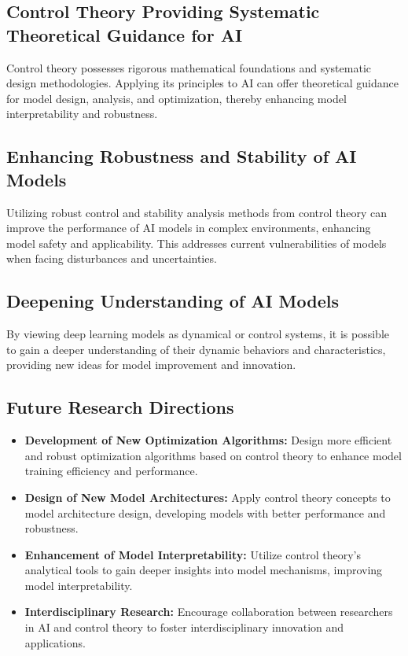 \documentclass{article}
\theoremstyle{plain}
\theoremstyle{definition}
\theoremstyle{remark}
\begin{document}
\subsection{Control Theory Providing Systematic Theoretical Guidance for AI}
Control theory possesses rigorous mathematical foundations and systematic design methodologies. Applying its principles to AI can offer theoretical guidance for model design, analysis, and optimization, thereby enhancing model interpretability and robustness.

\subsection{Enhancing Robustness and Stability of AI Models}
Utilizing robust control and stability analysis methods from control theory can improve the performance of AI models in complex environments, enhancing model safety and applicability. This addresses current vulnerabilities of models when facing disturbances and uncertainties.

\subsection{Deepening Understanding of AI Models}
By viewing deep learning models as dynamical or control systems, it is possible to gain a deeper understanding of their dynamic behaviors and characteristics, providing new ideas for model improvement and innovation.

\subsection{Future Research Directions}
\begin{itemize}
    \item \textbf{Development of New Optimization Algorithms:} Design more efficient and robust optimization algorithms based on control theory to enhance model training efficiency and performance.
    
    \item \textbf{Design of New Model Architectures:} Apply control theory concepts to model architecture design, developing models with better performance and robustness.
    
    \item \textbf{Enhancement of Model Interpretability:} Utilize control theory's analytical tools to gain deeper insights into model mechanisms, improving model interpretability.
    
    \item \textbf{Interdisciplinary Research:} Encourage collaboration between researchers in AI and control theory to foster interdisciplinary innovation and applications.
\end{itemize}
\end{document}
